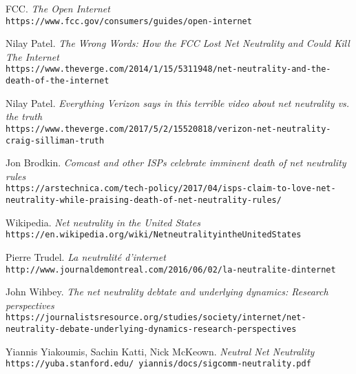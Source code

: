 \documentclass[12pt]{article}
\begin{document}
\begin{thebibliography}{12}
FCC.
\textit{The Open Internet}
\\\texttt{https://www.fcc.gov/consumers/guides/open-internet}

Nilay Patel.
\textit{The Wrong Words: How the FCC Lost Net Neutrality and Could Kill The Internet}
\\\texttt{https://www.theverge.com/2014/1/15/5311948/net-neutrality-and-the-death-of-the-internet}

Nilay Patel.
\textit{Everything Verizon says in this terrible video about net neutrality vs. the truth}
\\\texttt{https://www.theverge.com/2017/5/2/15520818/verizon-net-neutrality-craig-silliman-truth}

Jon Brodkin.
\textit{Comcast and other ISPs celebrate imminent death of net neutrality rules}
\\\texttt{https://arstechnica.com/tech-policy/2017/04/isps-claim-to-love-net-neutrality-while-praising-death-of-net-neutrality-rules/}

Wikipedia.
\textit{Net neutrality in the United States}
\\\texttt{https://en.wikipedia.org/wiki/Net\textunderscore neutrality\textunderscore in\textunderscore the\textunderscore United\textunderscore States}

Pierre Trudel.
\textit{La neutralité d'internet}
\\\texttt{http://www.journaldemontreal.com/2016/06/02/la-neutralite-dinternet}

John Wihbey.
\textit{The net neutrality debtate and underlying dynamics: Research perspectives}
\\\texttt{https://journalistsresource.org/studies/society/internet/net-neutrality-debate-underlying-dynamics-research-perspectives}

Yiannis Yiakoumis, Sachin Katti, Nick McKeown.
\textit{Neutral Net Neutrality}
\\\texttt{https://yuba.stanford.edu/~yiannis/docs/sigcomm-neutrality.pdf}


\end{thebibliography}
\end{document}
